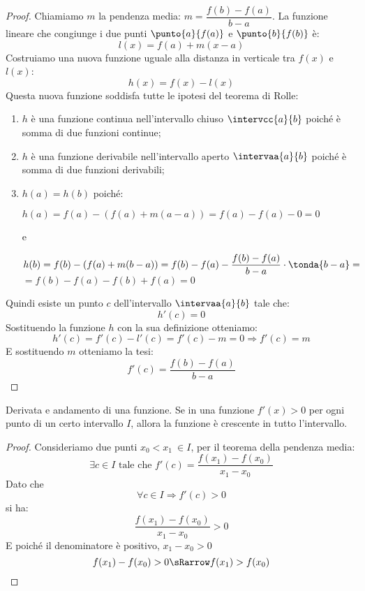 \begin{proof}
Chiamiamo \(m\) la pendenza media: \(m=\dfrac{f(b)-f(a)}{b-a}\). 
La funzione lineare che congiunge i due 
punti \(\punto{a}{f(a)}\) e \(\punto{b}{f(b)}\) è:
\[l(x) = f(a) + m(x-a)\]
Costruiamo una nuova funzione uguale alla distanza in verticale tra \(f(x)\) 
e \(l(x)\):
\[h(x) = f(x) - l(x)\]
Questa nuova funzione soddisfa tutte le ipotesi del teorema di Rolle:
\begin{enumerate}[nosep]
 \item \(h\) è una funzione continua 
 nell'intervallo chiuso \(\intervcc{a}{b}\)
 poiché è somma di due funzioni continue;
 \item \(h\) è una funzione derivabile 
 nell'intervallo aperto \(\intervaa{a}{b}\)
 poiché è somma di due funzioni derivabili;
 \item \(h(a)=h(b)\)  poiché:
 
 \(h(a)=f(a) - (f(a) + m(a-a))=f(a)-f(a)-0=0\)
 
 e 
 
 \(h(b)=f(b) - (f(a) + m(b-a))=
 f(b)-f(a)-\dfrac{f(b)-f(a)}{b-a}\cdot \tonda{b-a}=\)\\
 \(=f(b)-f(a)-f(b)+f(a)=0\)
\end{enumerate}
 
 Quindi esiste un punto \(c\) dell'intervallo \(\intervaa{a}{b}\) tale che:
 \[h'(c)=0\]
 Sostituendo la funzione \(h\) con la sua definizione otteniamo:
 \[h'(c) = f'(c)-l'(c)= f'(c)-m=0 \Rightarrow f'(c)=m\]
 E sostituendo \(m\) otteniamo la tesi:
 \[f'(c)=\dfrac{f(b)-f(a)}{b-a}\]
\end{proof}

\pagebreak %

\begin{corollario}
Derivata e andamento di una funzione. Se in una funzione \(f'(x)>0\) per ogni 
punto di un certo intervallo \(I\), allora la funzione è crescente in tutto 
l'intervallo.
\end{corollario}
% 

\begin{proof}
Consideriamo due punti \(x_0 < x_1 ~ \in I\), 
per il teorema della pendenza media:
\[\exists c \in I \text { tale che } f'(c) = \dfrac{f(x_1)-f(x_0)}{x_1-x_0}\]
Dato che 
\[\forall c \in I \Rightarrow f'(c) > 0\]
si ha:
\[\dfrac{f(x_1)-f(x_0)}{x_1-x_0}>0 \]
E poiché il denominatore è positivo, \(x_1 - x_0 > 0\)
\[f(x_1)-f(x_0)>0 \sRarrow f(x_1)>f(x_0)\]
\end{proof}

